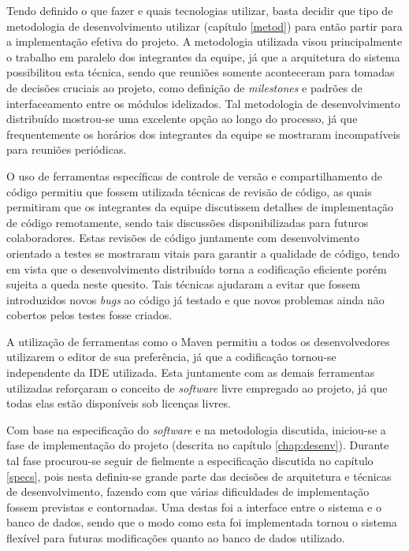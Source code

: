 Tendo definido o que fazer e quais tecnologias utilizar, basta decidir que tipo de metodologia de desenvolvimento utilizar (capítulo \ref{metod}) para então partir para a implementação efetiva do projeto. 
A metodologia utilizada visou principalmente o trabalho em paralelo dos integrantes da equipe, já que a arquitetura do sistema possibilitou esta técnica, sendo que reuniões somente aconteceram para tomadas de decisões cruciais ao projeto, como definição de \emph{milestones} e padrões de interfaceamento entre os módulos idelizados.
Tal metodologia de desenvolvimento distribuído mostrou-se uma excelente opção ao longo do processo, já que frequentemente os horários dos integrantes da equipe se mostraram incompatíveis para reuniões periódicas.

O uso de ferramentas específicas de controle de versão e compartilhamento de código permitiu que fossem utilizada técnicas de revisão de código, as quais permitiram que os integrantes da equipe discutissem detalhes de implementação de código remotamente, sendo tais discussões disponibilizadas para futuros colaboradores. 
Estas revisões de código juntamente com desenvolvimento orientado a testes se mostraram vitais para garantir a qualidade de código, tendo em vista que o desenvolvimento distribuído torna a codificação eficiente porém sujeita a queda neste quesito.
Tais técnicas ajudaram a evitar que fossem introduzidos novos \emph{bugs} ao código já testado e que novos problemas ainda não cobertos pelos testes fosse criados.

A utilização de ferramentas como o Maven permitiu a todos os desenvolvedores utilizarem o editor de sua preferência, já que a codificação tornou-se independente da IDE utilizada.
Esta juntamente com as demais ferramentas utilizadas reforçaram o conceito de \emph{software} livre empregado ao projeto, já que todas elas estão disponíveis sob licenças livres. 

Com base na especificação do \emph{software} e na metodologia discutida, iniciou-se a fase de implementação do projeto (descrita no capítulo \ref{chap:desenv}). 
Durante tal fase procurou-se seguir de fielmente a especificação discutida no capítulo \ref{specs}, pois nesta definiu-se grande parte das decisões de arquitetura e técnicas de desenvolvimento, fazendo com que várias dificuldades de implementação fossem previstas e contornadas.
Uma destas foi a interface entre o sistema e o banco de dados, sendo que o modo como esta foi implementada tornou o sistema flexível para futuras modificações quanto ao banco de dados utilizado.

